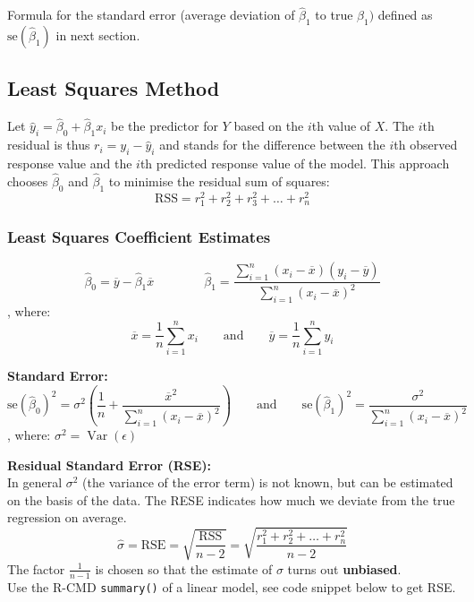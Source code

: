 \documentclass[11pt]{article}
\newcommand*\samplemean[1]{\overline{#1}}
\newcommand*\Var[1]{\mathop{\text{Var}}\left(#1\right)}
\begin{document}
\noindent
Formula for the standard error (average deviation of $\hat{\beta}_1$ to true $\beta_1)$ defined as $\text{se}(\hat{\beta}_1)$ in next section.

\newpage
\subsection{Least Squares Method}
Let $\hat{y}_i = \hat{\beta}_0 + \hat{\beta}_1 x_i$ be the predictor for $Y$ based on the $i$th value of $X$. The $i$th residual is thus $r_i = y_i - \hat{y}_i$ and stands for the difference between the $i$th observed response value and the $i$th predicted response value of the model. This approach chooses $\hat{\beta}_0$ and $\hat{\beta}_1$ to minimise the residual sum of squares:
\begin{equation*}
	\text{RSS} = r_1^2 + r_2^2 + r_3^2 + \dots + r_n^2
\end{equation*}

\subsubsection{Least Squares Coefficient Estimates}
\begin{definition}
	\begin{equation*}
		\hat{\beta}_0 = \samplemean{y} - \hat{\beta}_1 \samplemean{x} \qquad \qquad \hat{\beta}_1 = \frac{\sum_{i=1}^{n}(x_i - \samplemean{x})(y_i - \samplemean{y})}{\sum_{i=1}^{n}(x_i - \samplemean{x})^2}
	\end{equation*}
	, where:
	\begin{equation*}
		\samplemean{x} = \frac{1}{n}\sum_{i=1}^{n} x_i\qquad\text{and}\qquad\samplemean{y} = \frac{1}{n}\sum_{i=1}^{n} y_i	
	\end{equation*}
\end{definition}

\begin{definition}
	\textbf{Standard Error:}
	\begin{equation*}
		\text{se}(\hat{\beta}_0)^2 = \sigma^2 \left( \frac{1}{n} + \frac{\samplemean{x}^2}{\sum_{i=1}^{n}(x_i - \samplemean{x})^2} \right) \qquad\text{and}\qquad \text{se}(\hat{\beta}_1)^2 = \frac{\sigma^2}{\sum_{i=1}^{n}(x_i-\samplemean{x})^2}
	\end{equation*}
	, where: $\sigma^2 = \Var{\epsilon}$
\end{definition}

\begin{definition}
	\textbf{Residual Standard Error (RSE):}\\
	In general $\sigma^2$ (the variance of the error term) is not known, but can be estimated on the basis of the data. The RESE indicates how much we deviate from the true regression on average.
	\begin{equation*}
		\hat{\sigma} = \text{RSE} = \sqrt{\frac{\text{RSS}}{n-2}} = \sqrt{\frac{r_1^2 + r_2^2 + \dots + r_n^2}{n-2}}
	\end{equation*}
	The factor $\frac{1}{n-1}$ is chosen so that the estimate of $\sigma$ turns out \textbf{unbiased}.\\
	Use the R-CMD \texttt{summary()} of a linear model, see code snippet below to get RSE.
\end{definition}
\end{document}
